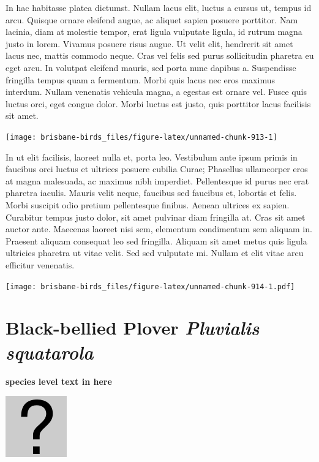 \documentclass[]{book}
\let\origfigure\figure
\let\endorigfigure\endfigure
\renewenvironment{figure}[1][2] {
  \expandafter\origfigure\expandafter[H]
} {
  \endorigfigure
}
\begin{document}
In hac habitasse platea dictumst. Nullam lacus elit, luctus a cursus ut,
tempus id arcu. Quisque ornare eleifend augue, ac aliquet sapien posuere
porttitor. Nam lacinia, diam at molestie tempor, erat ligula vulputate
ligula, id rutrum magna justo in lorem. Vivamus posuere risus augue. Ut
velit elit, hendrerit sit amet lacus nec, mattis commodo neque. Cras vel
felis sed purus sollicitudin pharetra eu eget arcu. In volutpat eleifend
mauris, sed porta nunc dapibus a. Suspendisse fringilla tempus quam a
fermentum. Morbi quis lacus nec eros maximus interdum. Nullam venenatis
vehicula magna, a egestas est ornare vel. Fusce quis luctus orci, eget
congue dolor. Morbi luctus est justo, quis porttitor lacus facilisis sit
amet.

\begin{figure}
\texttt{[image: brisbane-birds\_files/figure-latex/unnamed-chunk-913-1]} \caption{insert figure caption}\label{fig:unnamed-chunk-913}
\end{figure}

In ut elit facilisis, laoreet nulla et, porta leo. Vestibulum ante ipsum
primis in faucibus orci luctus et ultrices posuere cubilia Curae;
Phasellus ullamcorper eros at magna malesuada, ac maximus nibh
imperdiet. Pellentesque id purus nec erat pharetra iaculis. Mauris velit
neque, faucibus sed faucibus et, lobortis et felis. Morbi suscipit odio
pretium pellentesque finibus. Aenean ultrices ex sapien. Curabitur
tempus justo dolor, sit amet pulvinar diam fringilla at. Cras sit amet
auctor ante. Maecenas laoreet nisi sem, elementum condimentum sem
aliquam in. Praesent aliquam consequat leo sed fringilla. Aliquam sit
amet metus quis ligula ultricies pharetra ut vitae velit. Sed sed
vulputate mi. Nullam et elit vitae arcu efficitur venenatis.

\begin{figure}
\centering
\texttt{[image: brisbane-birds\_files/figure-latex/unnamed-chunk-914-1.pdf]}
\caption{\label{fig:unnamed-chunk-914}insert figure caption}
\end{figure}

\section{\texorpdfstring{Black-bellied Plover \emph{Pluvialis
squatarola}}{Black-bellied Plover Pluvialis squatarola}}\label{black-bellied-plover-pluvialis-squatarola}

\textbf{species level text in here}

\begin{figure}
\centering
\includegraphics{assets/missing.png}
\caption{No image for species}
\end{figure}
\end{document}
